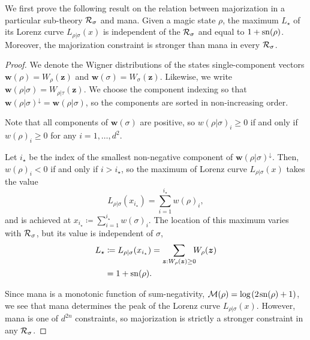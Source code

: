 \documentclass[
twocolumn,
superscriptaddress
]{revtex4-1}
\newenvironment{customthm}[1]
  {\renewcommand\theinnercustomthm{#1}\innercustomthm}
  {\endinnercustomthm}
\def\z{\boldsymbol{z}}
\def\w{\boldsymbol{w}}
\def\R{{\cal R}}
\def\M{{\cal M}}
\begin{document}
We first prove the following result on the relation between majorization in a particular sub-theory $\R_\sigma$ and mana.
\begin{customthm}{5}
	Given a magic state $\rho$, the maximum $L_\star$ of its Lorenz curve $L_{\rho|\sigma}(x)$ is independent of the $\R_\sigma$ and equal to $1+{\rm sn}(\rho)$. Moreover, the majorization constraint is stronger than mana in every $\R_\sigma$.
\end{customthm}
\begin{proof}
	We denote the Wigner distributions of the states single-component vectors $\w(\rho)=W_\rho(\z)$ and $ \w(\sigma)=W_\sigma(\z)$. Likewise, we write $\w(\rho|\sigma) = W_{\rho|\tau}(\z)$.
	We choose the component indexing so that $\w(\rho|\sigma)^\downarrow = \w(\rho|\sigma)$, so the components are sorted in non-increasing order.

Note that all components of $\w(\sigma)$ are positive, so $w(\rho|\sigma)_i \geq 0$ if and only if $w(\rho)_i \geq 0$ for any $i=1,\dots,d^2$.
	
	Let $i_\star$ be the index of the smallest non-negative component of $\w(\rho|\sigma)^\downarrow$.
	Then, $w(\rho)_i < 0$ if and only if $i > i_\star$, so the maximum of Lorenz curve $L_{\rho|\sigma}(x)$ takes the value 
	\begin{equation}
		L_{\rho|\sigma}(x_{i_\star}) = \sum_{i=1}^{i_\star} w(\rho)_i,
	\end{equation}
	and is achieved at $x_{i_\star} \coloneqq \sum_{i=1}^{i_\star} w(\sigma)_i$. The location of this maximum varies with $\R_\sigma$, but its value is independent of $\sigma$,
	\begin{align}
	L_\star &\coloneqq	L_{\rho|\sigma}(x_{i_\star}) 
		= \sum\limits_{\z: W_{\rho}(\z) \geq 0}\hspace{-5pt} W_{\rho}(\z) \nonumber \\
		&= 1 + {\rm sn}(\rho).
	\end{align}
	
Since mana is a monotonic function of sum-negativity, $\M(\rho) = \log \hspace{1pt}(2\hspace{1pt}{\rm sn}(\rho)+1)$, we see that mana determines the peak of the Lorenz curve $L_{\rho|\sigma}(x)$. However, mana is one of $d^{2n}$ constraints, so majorization is strictly a stronger constraint in any $\R_\sigma$.
\end{proof}
\end{document}
